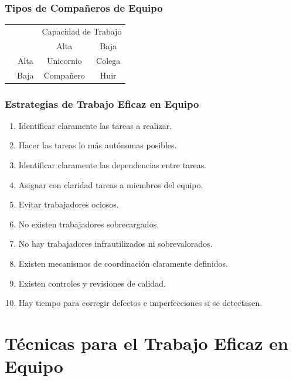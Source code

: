 \documentclass[a4paper,t,xcolor=pst,dvips]{beamer}
\begin{document}
\begin{frame}[c]
	\frametitle{Tipos de Compañeros de Equipo}
	
	\renewcommand{\arraystretch}{2.0}
	
	\begin{center}
		\begin{tabular}{|l|p{2cm}|p{2cm}|p{2cm}|}
			\cline{3-4}
			\multicolumn{2}{l}{}  & \multicolumn{2}{|c|}{Capacidad de  Trabajo} \\ \cline{3-4}
			\multicolumn{2}{l|}{} & \multicolumn{1}{c|}{Alta}                 & 
			\multicolumn{1}{c|}{Baja}         \\ \cline{1-4}
			\multirow{2}{*}{\rotatebox[origin=c]{90}{Afinidad}} & 
			\multicolumn{1}{c|}{Alta} & \multicolumn{1}{c|}{Unicornio} & \multicolumn{1}{c|}{Colega} \\
			\cline{2-4}
			& \multicolumn{1}{c|}{Baja} & \multicolumn{1}{c|}{Compañero}  & \multicolumn{1}{c|}{Huir} \\
			\cline{1-4}
		\end{tabular}
	\end{center}
\end{frame}

\begin{frame}[c]
	\frametitle{Estrategias de Trabajo Eficaz en Equipo}
	\begin{enumerate}[<+->]
		\item Identificar claramente las tareas a realizar.
		\item Hacer las tareas lo más autónomas posibles.
		\item Identificar claramente las dependencias entre tareas.
		\item Asignar con claridad tareas a miembros del equipo.
		\item Evitar trabajadores ociosos.
		\item No existen trabajadores sobrecargados.
		\item No hay trabajadores infrautilizados ni sobrevalorados.
		\item Existen mecanismos de coordinación claramente definidos.
		\item Existen controles y revisiones de calidad.
		\item Hay tiempo para corregir defectos e imperfecciones si se detectasen.
	\end{enumerate}
\end{frame}

\section{Técnicas para el Trabajo Eficaz en Equipo}
\end{document}
